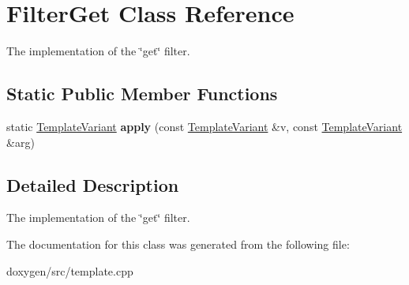 \hypertarget{class_filter_get}{}\section{Filter\+Get Class Reference}
\label{class_filter_get}


The implementation of the \char`\"{}get\char`\"{} filter.  


\subsection*{Static Public Member Functions}
\begin{DoxyCompactItemize}
\item 
\mbox{\label{class_filter_get_af30ca9e98ae55b32787798c000ab0ac2}} 
static \mbox{\hyperlink{class_template_variant}{Template\+Variant}} {\bfseries apply} (const \mbox{\hyperlink{class_template_variant}{Template\+Variant}} \&v, const \mbox{\hyperlink{class_template_variant}{Template\+Variant}} \&arg)
\end{DoxyCompactItemize}


\subsection{Detailed Description}
The implementation of the \char`\"{}get\char`\"{} filter. 

The documentation for this class was generated from the following file\+:\begin{DoxyCompactItemize}
\item 
doxygen/src/template.\+cpp\end{DoxyCompactItemize}
